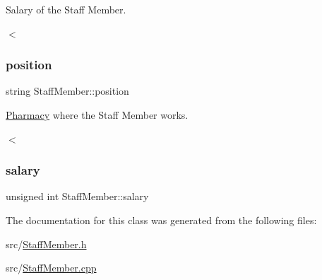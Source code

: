 Salary of the Staff Member. 

$<$ \mbox{\label{classStaffMember_a170b93cb78c310afcb87b24c5164a9b7}} 
\subsubsection{\texorpdfstring{position}{position}}
{\footnotesize\ttfamily string Staff\+Member\+::position\hspace{0.3cm}{\ttfamily [private]}}



\hyperlink{classPharmacy}{Pharmacy} where the Staff Member works. 

$<$ \mbox{\label{classStaffMember_ae64ceda8a343e92fe577ae6cad878e6c}} 
\subsubsection{\texorpdfstring{salary}{salary}}
{\footnotesize\ttfamily unsigned int Staff\+Member\+::salary\hspace{0.3cm}{\ttfamily [private]}}



The documentation for this class was generated from the following files\+:\begin{DoxyCompactItemize}
\item 
src/\hyperlink{StaffMember_8h}{Staff\+Member.\+h}\item 
src/\hyperlink{StaffMember_8cpp}{Staff\+Member.\+cpp}\end{DoxyCompactItemize}
